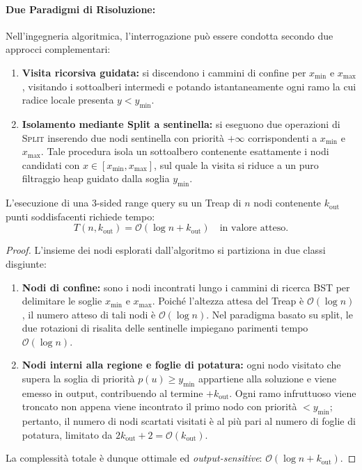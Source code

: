 \paragraph{Due Paradigmi di Risoluzione:}
Nell'ingegneria algoritmica, l'interrogazione pu\`o essere condotta secondo due approcci complementari:
\begin{enumerate}
    \item \textbf{Visita ricorsiva guidata:} si discendono i cammini di confine per $x_{\min}$ e $x_{\max}$, visitando i sottoalberi intermedi e potando istantaneamente ogni ramo la cui radice locale presenta $y < y_{\min}$.
    \item \textbf{Isolamento mediante Split a sentinella:} si eseguono due operazioni di \textsc{Split} inserendo due nodi sentinella con priorit\`a $+\infty$ corrispondenti a $x_{\min}$ e $x_{\max}$. Tale procedura isola un sottoalbero contenente esattamente i nodi candidati con $x \in [x_{\min}, x_{\max}]$, sul quale la visita si riduce a un puro filtraggio heap guidato dalla soglia $y_{\min}$.
\end{enumerate}

\begin{theorem}
L'esecuzione di una 3-sided range query su un Treap di $n$ nodi contenente $k_{\text{out}}$ punti soddisfacenti richiede tempo:
\begin{equation}
  T(n, k_{\text{out}}) = \mathcal{O}(\log n + k_{\text{out}}) \quad \text{in valore atteso.}
\end{equation}
\end{theorem}

\begin{proof}
L'insieme dei nodi esplorati dall'algoritmo si partiziona in due classi disgiunte:
\begin{enumerate}
    \item \textbf{Nodi di confine:} sono i nodi incontrati lungo i cammini di ricerca BST per delimitare le soglie $x_{\min}$ e $x_{\max}$. Poich\'e l'altezza attesa del Treap \`e $\mathcal{O}(\log n)$, il numero atteso di tali nodi \`e $\mathcal{O}(\log n)$. Nel paradigma basato su split, le due rotazioni di risalita delle sentinelle impiegano parimenti tempo $\mathcal{O}(\log n)$.
    \item \textbf{Nodi interni alla regione e foglie di potatura:} ogni nodo visitato che supera la soglia di priorit\`a $p(u) \ge y_{\min}$ appartiene alla soluzione e viene emesso in output, contribuendo al termine $+k_{\text{out}}$. Ogni ramo infruttuoso viene troncato non appena viene incontrato il primo nodo con priorit\`a $< y_{\min}$; pertanto, il numero di nodi scartati visitati \`e al pi\`u pari al numero di foglie di potatura, limitato da $2 k_{\text{out}} + 2 = \mathcal{O}(k_{\text{out}})$.
\end{enumerate}
La complessit\`a totale \`e dunque ottimale ed \textit{output-sensitive}: $\mathcal{O}(\log n + k_{\text{out}})$.
\end{proof}

